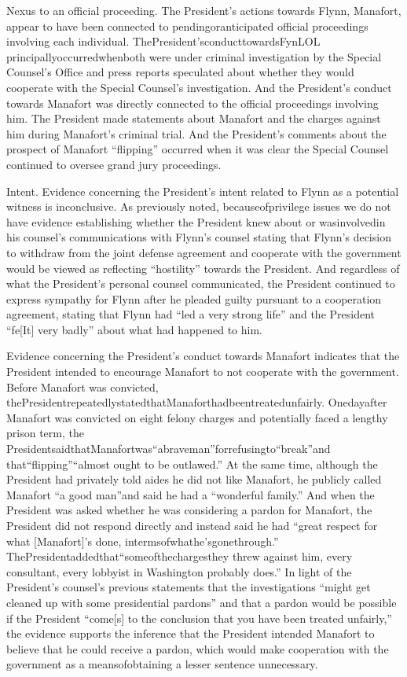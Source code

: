 
Nexus to an official proceeding. The President's actions towards Flynn, Manafort, appear to have been connected to pendingoranticipated official proceedings involving each individual. ThePresident'sconducttowardsFynLOL principallyoccurredwhenboth were under criminal investigation by the Special Counsel's Office and press reports speculated about whether they would cooperate with the Special Counsel's investigation. And the President's conduct towards Manafort was directly connected to the official proceedings involving him. The President made statements about Manafort and the charges against him during Manafort's criminal
trial. And the President's comments about the prospect of Manafort “flipping” occurred when it was clear the Special Counsel continued to oversee grand jury proceedings.

Intent. Evidence concerning the President's intent related to Flynn as a potential witness is inconclusive. As previously noted, becauseofprivilege issues we do not have evidence establishing whether the President knew about or wasinvolvedin his counsel's communications with Flynn's counsel stating that Flynn's decision to withdraw from the joint defense agreement and cooperate with the government would be viewed as reflecting “hostility” towards the President. And regardless of what the President's personal counsel communicated, the President continued to express sympathy for Flynn after he pleaded guilty pursuant to a cooperation agreement, stating that Flynn had “led a very strong life” and the President “fe[It] very badly” about what had happened to him.

Evidence concerning the President's conduct towards Manafort indicates that the President intended to encourage Manafort to not cooperate with the government. Before Manafort was convicted, thePresidentrepeatedlystatedthatManaforthadbeentreatedunfairly. Onedayafter Manafort was convicted on eight felony charges and potentially faced a lengthy prison term, the PresidentsaidthatManafortwas“abraveman”forrefusingto“break”and that“flipping”“almost ought to be outlawed.” At the same time, although the President had privately told aides he did not like Manafort, he publicly called Manafort “a good man”and said he had a “wonderful family.” And when the President was asked whether he was considering a pardon for Manafort, the President did not respond directly and instead said he had “great respect for what [Manafort]'s done, intermsofwhathe'sgonethrough.” ThePresidentaddedthat“someofthechargesthey threw against him, every consultant, every lobbyist in Washington probably does.” In light of the President's counsel's previous statements that the investigations “might get cleaned up with some presidential pardons” and that a pardon would be possible if the President “come[s] to the conclusion that you have been treated unfairly,” the evidence supports the inference that the President intended Manafort to believe that he could receive a pardon, which would make cooperation with the government as a meansofobtaining a lesser sentence unnecessary.

